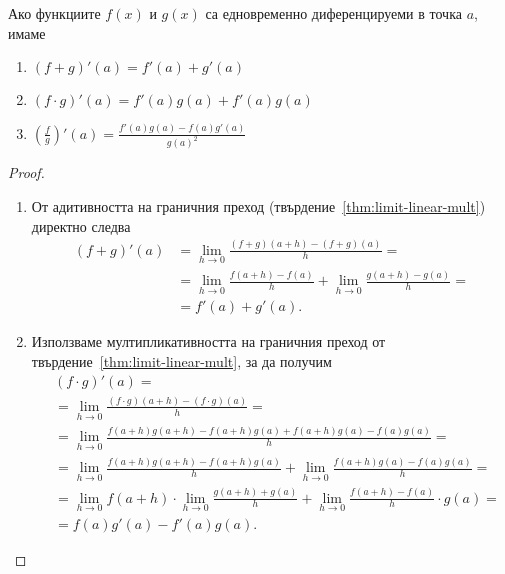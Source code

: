 \documentclass[numbers=endperiod, bibliography=totocnumbered]{scrartcl}
\begin{document}
\begin{theorem}
  Ако функциите \( f(x) \) и \( g(x) \) са едновременно диференцируеми в точка \( a \), имаме
  \begin{enumerate}
    \item \( (f+g)'(a) = f'(a) + g'(a) \)
    \item \( (f \cdot g)'(a) = f'(a) g(a) + f'(a) g(a) \)
    \item \( (\frac f g)'(a) = \frac{f'(a) g(a) - f(a) g'(a)} {{g(a)}^2} \)
  \end{enumerate}
\end{theorem}
\begin{proof}
  \mbox{}
  \begin{enumerate}
    \item От адитивността на граничния преход (твърдение~\ref{thm:limit-linear-mult}) директно следва
    \begin{align*}
      (f+g)'(a)
      &=
      \lim_{h \to 0} \frac {(f+g)(a+h) - (f+g)(a)} h
      = \\ &=
      \lim_{h \to 0} \frac {f(a+h)-f(a)} h + \lim_{h \to 0} \frac{g(a+h) - g(a)} h
      = \\ &=
      f'(a) + g'(a).
    \end{align*}

    \item Използваме мултипликативността на граничния преход от твърдение~\ref{thm:limit-linear-mult}, за да получим
    \begin{align*}
      &(f \cdot g)'(a)
      = \\ &=
      \lim_{h \to 0} \frac {(f \cdot g)(a+h) - (f \cdot g)(a)} h
      = \\ &=
      \lim_{h \to 0} \frac {f(a+h) g(a+h) - f(a+h) g(a) + f(a+h) g(a) - f(a) g(a)} h
      = \\ &=
      \lim_{h \to 0} \frac {f(a+h) g(a+h) - f(a+h) g(a)} h + \lim_{h \to 0} \frac {f(a+h) g(a) - f(a) g(a)} h
      = \\ &=
      \lim_{h \to 0} f(a+h) \cdot \lim_{h \to 0} \frac {g(a+h) + g(a)} h + \lim_{h \to 0} \frac {f(a+h) - f(a)} h \cdot g(a)
      = \\ &=
      f(a) g'(a) - f'(a) g(a).
    \end{align*}


\end{enumerate}
\end{proof}
\end{document}
